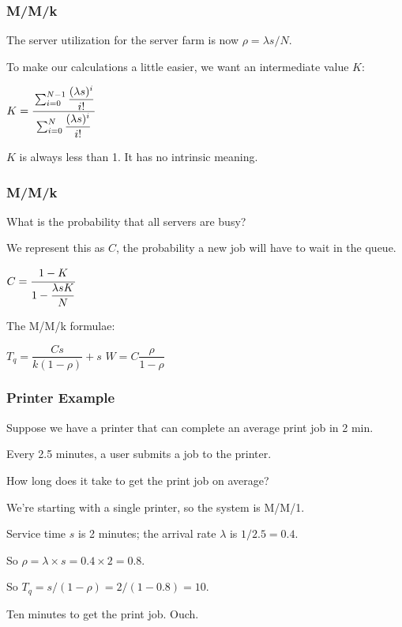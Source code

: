 \begin{frame}
\frametitle{M/M/k}

The server utilization for the server farm is now $\rho = \lambda s / N$.

To make our calculations a little easier, we want an intermediate value $K$:
\begin{center}
	$K = \cfrac{\sum_{i=0}^{N-1}\dfrac{(\lambda s)^{i}}{i!}}{{\sum_{i=0}^{N}\dfrac{(\lambda s)^{i}}{i!}}}$
\end{center}

$K$ is always less than 1. It has no intrinsic meaning.

\end{frame}

\begin{frame}
\frametitle{M/M/k}

What is the probability that all servers are busy? 

We represent this as $C$, the probability a new job will have to wait in the queue.

\begin{center}
	$C = \cfrac{1 - K}{1 - \dfrac{\lambda s K}{N}}$
\end{center}

The M/M/k formulae: 

\begin{center}
  $T_{q} = \dfrac{C s}{k(1 - \rho)} + s$ \qquad\qquad\qquad\qquad $W = C \dfrac{\rho}{1 - \rho}$
\end{center}


\end{frame}


\begin{frame}
\frametitle{Printer Example}

Suppose we have a printer that can complete an average print job in 2 min. 

Every 2.5 minutes, a user submits a job to the printer. 

How long does it take to get the print job on average? 

We're starting with a single printer, so the system is M/M/1. 

Service time $s$ is 2 minutes; the arrival rate $\lambda$ is $1/2.5 = 0.4$. 

So $\rho = \lambda \times s = 0.4 \times 2 = 0.8$. 

So $T_{q} = s / (1 - \rho ) = 2 / (1 -0.8 ) = 10$. 

Ten minutes to get the print job. Ouch.

\end{frame}



